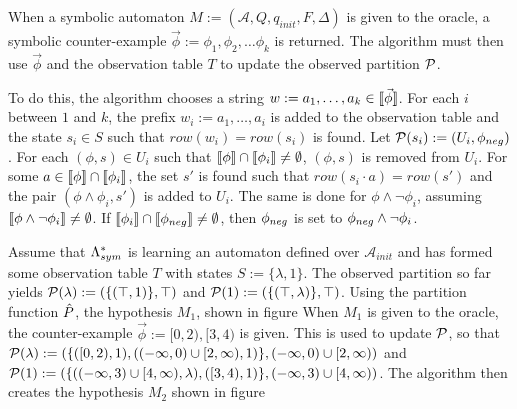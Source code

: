 When a symbolic automaton $M := (\mathcal{A}, Q, q_{init}, F, \Delta)$ is given to the oracle, a symbolic counter-example $\vec{\phi} := \phi_1, \phi_2, \dots \phi_k $ is returned. 
The algorithm must then use $\vec{\phi}$ and the observation table $T$ to update the observed partition $\mathcal{P}$. 

To do this, the algorithm chooses a string $w := a_1,\dots, a_k \in \llbracket \vec{\phi} \rrbracket$. 
For each $i$ between $1$ and $k$, the prefix $w_i := a_1, \dots, a_i$ is added to the observation table and the state $s_i \in S$ such that $row(w_i) = row(s_i)$ is found.
Let $\mathcal{P}(s_i) := (U_i, \phi_{neg})$.
For each $(\phi, s) \in U_i$ such that $\llbracket \phi \rrbracket \cap \llbracket \phi_i \rrbracket \ne \emptyset$,  $(\phi, s)$ is removed from $U_i$.
For some $a \in \llbracket \phi \rrbracket \cap \llbracket \phi_i \rrbracket$, the set $s'$ is found  such that $row(s_i \cdot a) = row(s')$ and the pair $(\phi \wedge \phi_i, s')$ is added to $U_i$.
The same is done for $\phi \wedge \neg\phi_i$, assuming $\llbracket \phi \wedge \neg\phi_i \rrbracket \ne \emptyset$.
If $\llbracket \phi_i \rrbracket \cap \llbracket \phi_{neg} \rrbracket \ne \emptyset$, then $\phi_{neg}$ is set to $\phi_{neg} \wedge \neg\phi_i$. 


\begin{example}
Assume that $\Lambda^*_{sym}$ is learning an automaton defined over $\mathcal{A}_{init}$ and has formed some observation table $T$ with states $S := \{ \lambda, 1 \}$.
The observed partition so far yields $\mathcal{P}(\lambda) := ( \{ (\top, 1) \}, \top)$ and $\mathcal{P}(1) := ( \{ (\top, \lambda) \}, \top)$.  
Using the partition function $\hat{P}$, the hypothesis $M_1$, shown in figure %
When $M_1$ is given to the oracle, the counter-example $\vec{\phi} := [0,2),[3,4)$ is given. 
This is used to update $\mathcal{P}$, so that $\mathcal{P}(\lambda) := ( \{ ([0,2), 1), ((-\infty,0)\cup[2,\infty),1) \}, (-\infty,0)\cup[2,\infty))$ and $\mathcal{P}(1) := ( \{ ((-\infty,3)\cup[4,\infty), \lambda), ([3,4), 1)  \}, (-\infty,3)\cup[4,\infty) )$.
The algorithm then creates the hypothesis $M_2$ shown in figure %
\end{example}


